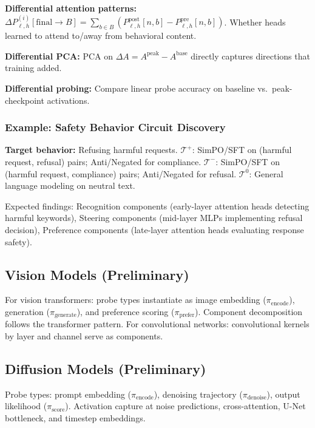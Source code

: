 \documentclass[11pt]{article}
\begin{document}
\textbf{Differential attention patterns:} $\Delta P^{(i)}_{\ell,h}[\text{final} \to B] = \sum_{b \in B} (P^{\text{post}}_{\ell,h}[n, b] - P^{\text{pre}}_{\ell,h}[n, b])$. Whether heads learned to attend to/away from behavioral content.

\textbf{Differential PCA:} PCA on $\Delta A = A^{\text{peak}} - A^{\text{base}}$ directly captures directions that training added.

\textbf{Differential probing:} Compare linear probe accuracy on baseline vs.\ peak-checkpoint activations.

\subsubsection{Example: Safety Behavior Circuit Discovery}

\noindent\textbf{Target behavior:} Refusing harmful requests.
$\mathcal{T}^+$: SimPO/SFT on (harmful request, refusal) pairs; Anti/Negated for compliance.
$\mathcal{T}^-$: SimPO/SFT on (harmful request, compliance) pairs; Anti/Negated for refusal.
$\mathcal{T}^0$: General language modeling on neutral text.

Expected findings: Recognition components (early-layer attention heads detecting harmful keywords), Steering components (mid-layer MLPs implementing refusal decision), Preference components (late-layer attention heads evaluating response safety).

\subsection{Vision Models (Preliminary)}

For vision transformers: probe types instantiate as image embedding ($\pi_{\text{encode}}$), generation ($\pi_{\text{generate}}$), and preference scoring ($\pi_{\text{prefer}}$). Component decomposition follows the transformer pattern. For convolutional networks: convolutional kernels by layer and channel serve as components.

\subsection{Diffusion Models (Preliminary)}

Probe types: prompt embedding ($\pi_{\text{encode}}$), denoising trajectory ($\pi_{\text{denoise}}$), output likelihood ($\pi_{\text{score}}$). Activation capture at noise predictions, cross-attention, U-Net bottleneck, and timestep embeddings.
\end{document}

